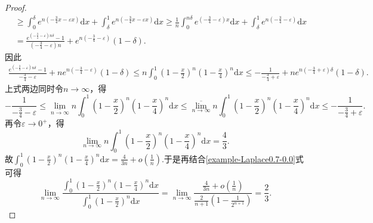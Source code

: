 \documentclass[../../main.tex]{subfiles}%
\begin{document}
\begin{proof}
\begin{align*}
&\geqslant \int_0^{\delta}{e^{n\left( -\frac{3}{4}x-\varepsilon x \right)}\mathrm{d}x}+\int_{\delta}^1{e^{n\left( -\frac{3}{4}x-\varepsilon x \right)}\mathrm{d}x}\geqslant \frac{1}{n}\int_0^{n\delta}{e^{\left( -\frac{3}{4}-\varepsilon \right) x}\mathrm{d}x}+\int_{\delta}^1{e^{n\left( -\frac{3}{4}-\varepsilon \right)}\mathrm{d}x}\\
&=\frac{e^{\left( -\frac{3}{4}-\varepsilon \right) n\delta}-1}{\left( -\frac{3}{4}-\varepsilon \right) n}+e^{n\left( -\frac{3}{4}-\varepsilon \right)}\left( 1-\delta \right) .
\end{align*}
因此
\begin{align*}
\frac{e^{\left( -\frac{3}{4}-\varepsilon \right) n\delta}-1}{-\frac{3}{4}-\varepsilon}+ne^{n\left( -\frac{3}{4}-\varepsilon \right)}\left( 1-\delta \right) \leqslant n\int_0^1{\left( 1-\frac{x}{2} \right) ^n\left( 1-\frac{x}{4} \right) ^n\mathrm{d}x}\leqslant -\frac{1}{-\frac{3}{4}+\varepsilon}+ne^{n\left( -\frac{3}{4}+\varepsilon \right) \delta}\left( 1-\delta \right) .
\end{align*}
上式两边同时令$n\rightarrow \infty$，得
\[
-\frac{1}{-\frac{3}{4}-\varepsilon}\leqslant \underset{n\rightarrow \infty}{\underline{\lim }}n\int_0^1{\left( 1-\frac{x}{2} \right) ^n\left( 1-\frac{x}{4} \right) ^n\mathrm{d}x}\leqslant \underset{n\rightarrow \infty}{\overline{\lim }}n\int_0^1{\left( 1-\frac{x}{2} \right) ^n\left( 1-\frac{x}{4} \right) ^n\mathrm{d}x}\leqslant -\frac{1}{-\frac{3}{4}+\varepsilon}.
\]
再令$\varepsilon \rightarrow 0^+$，得
\[
\lim\limits_{n\rightarrow \infty}n\int_0^1{\left( 1-\frac{x}{2} \right) ^n\left( 1-\frac{x}{4} \right) ^n\mathrm{d}x}=\frac{4}{3}.
\]
故$\int_0^1{\left( 1-\frac{x}{2} \right) ^n\left( 1-\frac{x}{4} \right) ^n\mathrm{d}x}=\frac{4}{3n}+o\left( \frac{1}{n} \right) .$于是再结合\eqref{example-Laplace0.7-0.0}式可得
\[
\lim_{n\rightarrow \infty} \frac{\int_0^1{\left( 1-\frac{x}{2} \right) ^n\left( 1-\frac{x}{4} \right) ^n\mathrm{d}x}}{\int_0^1{\left( 1-\frac{x}{2} \right) ^n\mathrm{d}x}}=\lim_{n\rightarrow \infty} \frac{\frac{4}{3n}+o\left( \frac{1}{n} \right)}{\frac{2}{n+1}\left( 1-\frac{1}{2^{n+1}} \right)}=\frac{2}{3}.
\]
\end{proof}
\end{document}
